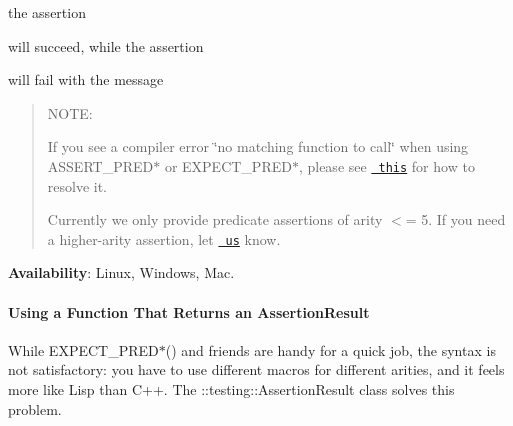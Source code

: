 the assertion


\begin{DoxyCode}{0}
\end{DoxyCode}


will succeed, while the assertion


\begin{DoxyCode}{0}
\end{DoxyCode}


will fail with the message


\begin{DoxyCode}{0}
\end{DoxyCode}


\begin{quote}
N\+O\+TE\+:


\begin{DoxyEnumerate}
\item If you see a compiler error \char`\"{}no matching function to call\char`\"{} when using {\ttfamily A\+S\+S\+E\+R\+T\+\_\+\+P\+R\+E\+D$\ast$} or {\ttfamily E\+X\+P\+E\+C\+T\+\_\+\+P\+R\+E\+D$\ast$}, please see \href{faq.md\#the-compiler-complains-no-matching-function-to-call-when-i-use-assert_pred-how-do-i-fix-it}{\texttt{ this}} for how to resolve it.
\end{DoxyEnumerate}
\begin{DoxyEnumerate}
\item Currently we only provide predicate assertions of arity $<$= 5. If you need a higher-\/arity assertion, let \href{https://github.com/google/googletest/issues}{\texttt{ us}} know. 
\end{DoxyEnumerate}\end{quote}


{\bfseries{Availability}}\+: Linux, Windows, Mac.

\paragraph*{Using a Function That Returns an Assertion\+Result}

While {\ttfamily E\+X\+P\+E\+C\+T\+\_\+\+P\+R\+E\+D$\ast$()} and friends are handy for a quick job, the syntax is not satisfactory\+: you have to use different macros for different arities, and it feels more like Lisp than C++. The {\ttfamily \+::testing\+::\+Assertion\+Result} class solves this problem.

